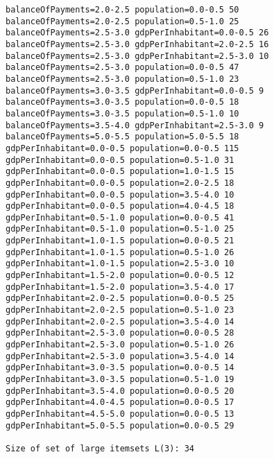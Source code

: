 \begin{lstlisting}[basicstyle=\footnotesize\ttfamily,numbers=none]
balanceOfPayments=2.0-2.5 population=0.0-0.5 50
balanceOfPayments=2.0-2.5 population=0.5-1.0 25
balanceOfPayments=2.5-3.0 gdpPerInhabitant=0.0-0.5 26
balanceOfPayments=2.5-3.0 gdpPerInhabitant=2.0-2.5 16
balanceOfPayments=2.5-3.0 gdpPerInhabitant=2.5-3.0 10
balanceOfPayments=2.5-3.0 population=0.0-0.5 47
balanceOfPayments=2.5-3.0 population=0.5-1.0 23
balanceOfPayments=3.0-3.5 gdpPerInhabitant=0.0-0.5 9
balanceOfPayments=3.0-3.5 population=0.0-0.5 18
balanceOfPayments=3.0-3.5 population=0.5-1.0 10
balanceOfPayments=3.5-4.0 gdpPerInhabitant=2.5-3.0 9
balanceOfPayments=5.0-5.5 population=5.0-5.5 18
gdpPerInhabitant=0.0-0.5 population=0.0-0.5 115
gdpPerInhabitant=0.0-0.5 population=0.5-1.0 31
gdpPerInhabitant=0.0-0.5 population=1.0-1.5 15
gdpPerInhabitant=0.0-0.5 population=2.0-2.5 18
gdpPerInhabitant=0.0-0.5 population=3.5-4.0 10
gdpPerInhabitant=0.0-0.5 population=4.0-4.5 18
gdpPerInhabitant=0.5-1.0 population=0.0-0.5 41
gdpPerInhabitant=0.5-1.0 population=0.5-1.0 25
gdpPerInhabitant=1.0-1.5 population=0.0-0.5 21
gdpPerInhabitant=1.0-1.5 population=0.5-1.0 26
gdpPerInhabitant=1.0-1.5 population=2.5-3.0 10
gdpPerInhabitant=1.5-2.0 population=0.0-0.5 12
gdpPerInhabitant=1.5-2.0 population=3.5-4.0 17
gdpPerInhabitant=2.0-2.5 population=0.0-0.5 25
gdpPerInhabitant=2.0-2.5 population=0.5-1.0 23
gdpPerInhabitant=2.0-2.5 population=3.5-4.0 14
gdpPerInhabitant=2.5-3.0 population=0.0-0.5 28
gdpPerInhabitant=2.5-3.0 population=0.5-1.0 26
gdpPerInhabitant=2.5-3.0 population=3.5-4.0 14
gdpPerInhabitant=3.0-3.5 population=0.0-0.5 14
gdpPerInhabitant=3.0-3.5 population=0.5-1.0 19
gdpPerInhabitant=3.5-4.0 population=0.0-0.5 20
gdpPerInhabitant=4.0-4.5 population=0.0-0.5 17
gdpPerInhabitant=4.5-5.0 population=0.0-0.5 13
gdpPerInhabitant=5.0-5.5 population=0.0-0.5 29

Size of set of large itemsets L(3): 34


\end{lstlisting}

